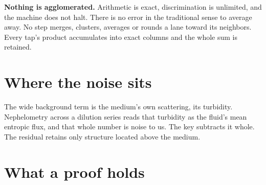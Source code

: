 \textbf{Nothing is agglomerated.} Arithmetic is exact, discrimination is unlimited, and the machine does not halt. There is no error in the traditional sense to average away. No step merges, clusters, averages or rounds a lane toward its neighbors. Every tap's product accumulates into exact columns and the whole sum is retained.

\section{\texorpdfstring{Where the noise sits}{Where the noise sits}}

The wide background term is the medium's own scattering, its turbidity. Nephelometry across a dilution series reads that turbidity as the fluid's mean entropic flux, and that whole number is noise to us. The key subtracts it whole. The residual retains only structure located above the medium.

\section{\texorpdfstring{What a proof holds}{What a proof holds}}

